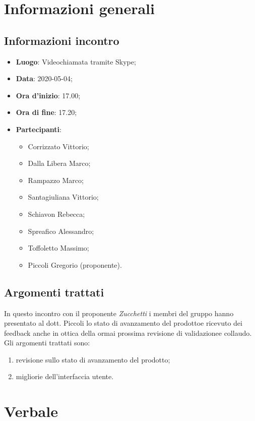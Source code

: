 \section{Informazioni generali}
    \subsection{Informazioni incontro}
        \begin{itemize}
            \item \textbf{Luogo}: Videochiamata tramite Skype;
            \item \textbf{Data}: 2020-05-04;
            \item \textbf{Ora d'inizio}: 17.00;
            \item \textbf{Ora di fine}: 17.20;
            \item \textbf{Partecipanti}: 
            \begin{itemize}
            	\item Corrizzato Vittorio;
                \item Dalla Libera Marco;
                \item Rampazzo Marco;
                \item Santagiuliana Vittorio;
                \item Schiavon Rebecca;
                \item Spreafico Alessandro;
                \item Toffoletto Massimo;
                \item Piccoli Gregorio (proponente).
            \end{itemize}
        \end{itemize}
    \subsection{Argomenti trattati}
        In questo incontro con il proponente \textit{Zucchetti} i membri del gruppo hanno presentato al dott. Piccoli lo stato di avanzamento del prodotto\glosp e ricevuto dei feedback anche in ottica della ormai prossima revisione di validazione\glosp e collaudo. Gli argomenti trattati sono:
        \begin{enumerate}
            \item revisione sullo stato di avanzamento del prodotto\glo;
            \item migliorie dell'interfaccia utente.
        \end{enumerate}
\section{Verbale}
